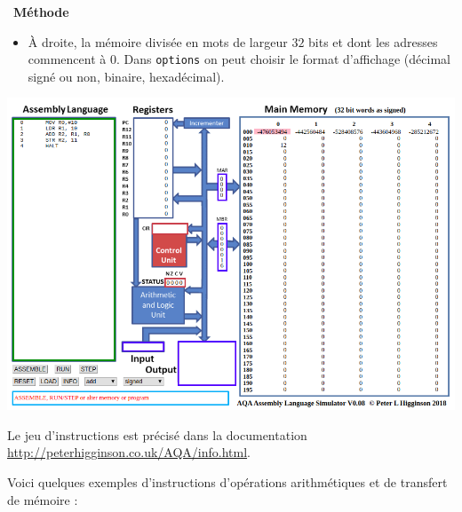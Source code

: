 \documentclass[a4paper, french, 11pt]{article}  %
\newenvironment{methode}[1]
{\par \medskip    \noindent  
 \begin {bclogo}[arrondi =0.1,logo=\bcoutil, marge=4,noborder = true] {~\textbf{Méthode}   {\itshape #1} }  \par}
{
\end{bclogo}
 \par \bigskip }
\begin{document}
\begin{methode}{}
\begin{itemize}
		\item À droite, la mémoire divisée en mots de largeur $32$ bits et dont les adresses commencent  à $0$. Dans \texttt{options} on peut choisir le format d'affichage (décimal signé ou non, binaire, hexadécimal).
	\end{itemize}	


\begin{center}
\includegraphics[scale=0.55]{images/simulateur_aqua.png}
\end{center}

Le jeu d'instructions est précisé dans la documentation \url{http://peterhigginson.co.uk/AQA/info.html}.

Voici quelques exemples d'instructions d'opérations arithmétiques et de transfert de mémoire :


\end{methode}
\end{document}
